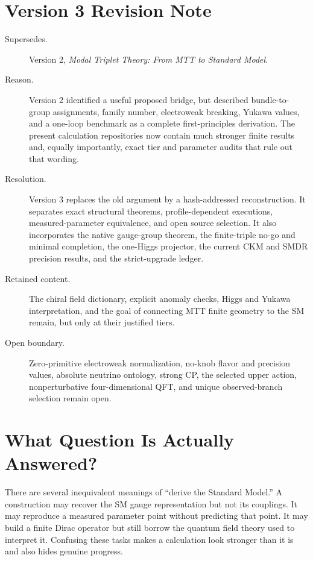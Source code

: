 \documentclass[11pt]{article}
\begin{document}
\section*{Version 3 Revision Note}
\begin{description}
\item[Supersedes.] Version 2, \emph{Modal Triplet Theory: From MTT to Standard Model}.
\item[Reason.] Version 2 identified a useful proposed bridge, but described bundle-to-group
assignments, family number, electroweak breaking, Yukawa values, and a one-loop benchmark as a
complete first-principles derivation.  The present calculation repositories now contain much
stronger finite results and, equally importantly, exact tier and parameter audits that rule out
that wording.
\item[Resolution.] Version 3 replaces the old argument by a hash-addressed reconstruction.  It
separates exact structural theorems, profile-dependent executions, measured-parameter
equivalence, and open source selection.  It also incorporates the native gauge-group theorem,
the finite-triple no-go and minimal completion, the one-Higgs projector, the current CKM and
SMDR precision results, and the strict-upgrade ledger.
\item[Retained content.] The chiral field dictionary, explicit anomaly checks, Higgs and Yukawa
interpretation, and the goal of connecting MTT finite geometry to the SM remain, but only at
their justified tiers.
\item[Open boundary.] Zero-primitive electroweak normalization, no-knob flavor and precision
values, absolute neutrino ontology, strong CP, the selected upper action, nonperturbative
four-dimensional QFT, and unique observed-branch selection remain open.
\end{description}

\tableofcontents

\section{What Question Is Actually Answered?}

There are several inequivalent meanings of ``derive the Standard Model.''  A construction may
recover the SM gauge representation but not its couplings.  It may reproduce a measured
parameter point without predicting that point.  It may build a finite Dirac operator but still
borrow the quantum field theory used to interpret it.  Confusing these tasks makes a calculation
look stronger than it is and also hides genuine progress.
\end{document}
